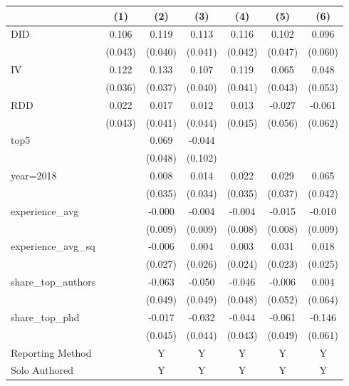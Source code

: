\begin{tabular}{l*{6}{c}}
\hline\hline
                &\multicolumn{1}{c}{(1)}&\multicolumn{1}{c}{(2)}&\multicolumn{1}{c}{(3)}&\multicolumn{1}{c}{(4)}&\multicolumn{1}{c}{(5)}&\multicolumn{1}{c}{(6)}\\
\hline
DID             &    0.106&    0.119&    0.113&    0.116&    0.102&    0.096\\
                &  (0.043)&  (0.040)&  (0.041)&  (0.042)&  (0.047)&  (0.060)\\
IV              &    0.122&    0.133&    0.107&    0.119&    0.065&    0.048\\
                &  (0.036)&  (0.037)&  (0.040)&  (0.041)&  (0.043)&  (0.053)\\
RDD             &    0.022&    0.017&    0.012&    0.013&   -0.027&   -0.061\\
                &  (0.043)&  (0.041)&  (0.044)&  (0.045)&  (0.056)&  (0.062)\\
top5            &         &    0.069&   -0.044&         &         &         \\
                &         &  (0.048)&  (0.102)&         &         &         \\
year=2018       &         &    0.008&    0.014&    0.022&    0.029&    0.065\\
                &         &  (0.035)&  (0.034)&  (0.035)&  (0.037)&  (0.042)\\
experience\_avg  &         &   -0.000&   -0.004&   -0.004&   -0.015&   -0.010\\
                &         &  (0.009)&  (0.009)&  (0.008)&  (0.008)&  (0.009)\\
experience\_avg\_sq&         &   -0.006&    0.004&    0.003&    0.031&    0.018\\
                &         &  (0.027)&  (0.026)&  (0.024)&  (0.023)&  (0.025)\\
share\_top\_authors&         &   -0.063&   -0.050&   -0.046&   -0.006&    0.004\\
                &         &  (0.049)&  (0.049)&  (0.048)&  (0.052)&  (0.064)\\
share\_top\_phd   &         &   -0.017&   -0.032&   -0.044&   -0.061&   -0.146\\
                &         &  (0.045)&  (0.044)&  (0.043)&  (0.049)&  (0.061)\\
Reporting Method &         &        Y&        Y&        Y&        Y&        Y\\
Solo Authored   &         &        Y&        Y&        Y&        Y&        Y\\

\end{tabular}
